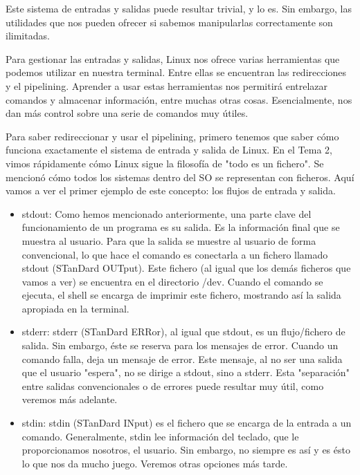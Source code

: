 Este sistema de entradas y salidas puede resultar trivial, y lo es. Sin embargo, las utilidades que nos pueden ofrecer si sabemos manipularlas correctamente son ilimitadas.

Para gestionar las entradas y salidas, Linux nos ofrece varias herramientas que podemos utilizar en nuestra terminal. Entre ellas se encuentran las redirecciones y el pipelining. Aprender a usar estas herramientas nos permitirá entrelazar comandos y almacenar información, entre muchas otras cosas. Esencialmente, nos dan más control sobre una serie de comandos muy útiles.

Para saber redireccionar y usar el pipelining, primero tenemos que saber cómo funciona exactamente el sistema de entrada y salida de Linux. En el Tema 2, vimos rápidamente cómo Linux sigue la filosofía de "todo es un fichero". Se mencionó cómo todos los sistemas dentro del SO se representan con ficheros. Aquí vamos a ver el primer ejemplo de este concepto: los flujos de entrada y salida.

\begin{itemize}
    \item stdout: Como hemos mencionado anteriormente, una parte clave del funcionamiento de un programa es su salida. Es la información final que se muestra al usuario. Para que la salida se muestre al usuario de forma convencional, lo que hace el comando es conectarla a un fichero llamado stdout (STanDard OUTput). Este fichero (al igual que los demás ficheros que vamos a ver) se encuentra en el directorio /dev. Cuando el comando se ejecuta, el shell se encarga de imprimir este fichero, mostrando así la salida apropiada en la terminal.

    \item stderr: stderr (STanDard ERRor), al igual que stdout, es un flujo/fichero de salida. Sin embargo, éste se reserva para los mensajes de error. Cuando un comando falla, deja un mensaje de error. Este mensaje, al no ser una salida que el usuario "espera", no se dirige a stdout, sino a stderr. Esta "separación" entre salidas convencionales o de errores puede resultar muy útil, como veremos más adelante.

    \item stdin: stdin (STanDard INput) es el fichero que se encarga de la entrada a un comando. Generalmente, stdin lee información del teclado, que le proporcionamos nosotros, el usuario. Sin embargo, no siempre es así y es ésto lo que nos da mucho juego. Veremos otras opciones más tarde.
\end{itemize}

